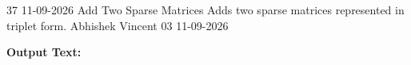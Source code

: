\clearpage
\label{prog:37}
\programhead
  {37}
  {11-09-2026}
  {Add Two Sparse Matrices}
  {Adds two sparse matrices represented in triplet form.}
  {Abhishek Vincent}
  {03}
  {11-09-2026}

\divider
\textbf{Output Text:}\par
\vspace{2pt}


